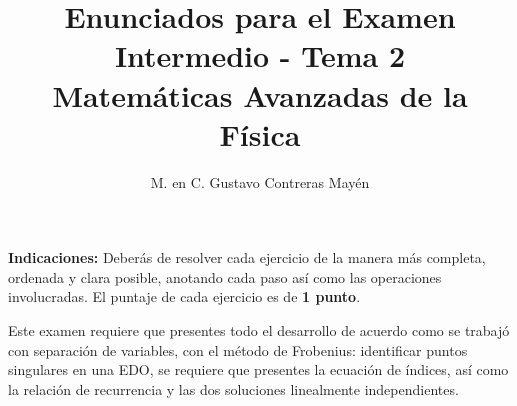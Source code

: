 
\title{Enunciados para el Examen Intermedio - Tema 2 \\[0.3em]  \large{Matemáticas Avanzadas de la Física}\vspace{-3ex}}
\author{M. en C. Gustavo Contreras Mayén}
\date{ }

\vspace{-4cm}
\maketitle
\fontsize{14}{14}\selectfont

\textbf{Indicaciones: } Deberás de resolver cada ejercicio de la manera más completa, ordenada y clara posible, anotando cada paso así como las operaciones involucradas. El puntaje de cada ejercicio es de \textbf{1 punto}.
\par
Este examen requiere que presentes todo el desarrollo de acuerdo como se trabajó con separación de variables, con el método de Frobenius: identificar puntos singulares en una EDO, se requiere que presentes la ecuación de índices, así como la relación de recurrencia y las dos soluciones linealmente independientes.

